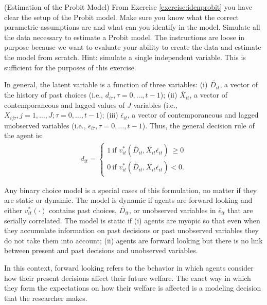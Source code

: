 \begin{exercise} (Estimation of the Probit Model)
From Exercise \ref{exercise:idenprobit} you have clear the setup of the Probit model. Make sure you know what the correct parametric assumptions are and what can you identify in the model. Simulate all the data necessary to estimate a Probit model. The instructions are loose in purpose because we want to evaluate your ability to create the data and estimate the model from scratch. Hint: simulate a single independent variable. This is sufficient for the purposes of this exercise.
\end{exercise}

\indent In general, the latent variable is a function of three variables: (i) $\tilde{D_{it}}$, a vector of the history of past choices (i.e., $d_{i\tau}, \tau = 0, \ldots, t-1$); (ii) $\tilde{X_{it}}$, a vector of contemporaneous and lagged values of $J$ variables (i.e., $X_{ij\tau},  j = 1, \ldots, J; \tau = 0, \ldots, t-1$); (iii) $\tilde{\epsilon_{it}}$, a vector of contemporaneous and lagged  unobserved variables (i.e., $\epsilon_{i\tau}, \tau = 0, \ldots, t-1$). Thus, the general decision rule of the agent is:
\begin{eqnarray}
d_{it} =
\begin{cases}
1 \  \text{if }  v_{it}^* \left( \tilde{D_{it}}, \tilde{X_{it}} \tilde{\epsilon_{it}} \right) \ \geq 0  \\
0 \  \text{if }  v_{it}^* \left( \tilde{D_{it}}, \tilde{X_{it}} \tilde{\epsilon_{it}} \right)  < 0. \label{eq:latent}
\end{cases}
\end{eqnarray}

\indent Any binary choice model is a special cases of this formulation, no matter if they are static or dynamic. The model is dynamic if agents are forward looking and either $v_{it}^* (\cdot)$ contains past choices, $\tilde{D_{it}}$, or unobserved variables in $\tilde{\epsilon_{it}}$ that are serially correlated. The model is static if (i) agents are myopic so that even when they accumulate information on past decisions or past unobserved variables they do not take them into account; (ii) agents are forward looking but there is no link between present and past decisions and unobserved variables.

\begin{remark}
In this context, forward looking refers to the behavior in which agents consider how their present decisions affect their future welfare. The exact way in which they form the expectations on how their welfare is affected is a modeling decision that the researcher makes.
\end{remark}


